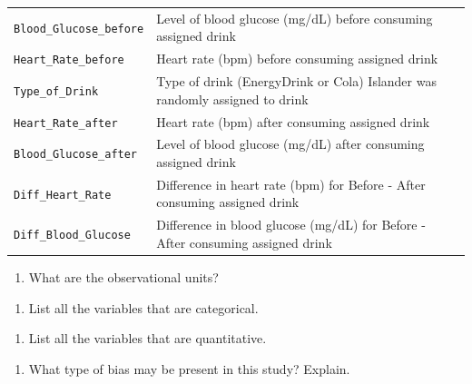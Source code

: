 \documentclass[
]{report}
\providecommand{\tightlist}{%
  \setlength{\itemsep}{0pt}\setlength{\parskip}{0pt}}
\begin{document}
\begin{longtable}[]{@{}
  >{\raggedright\arraybackslash}p{}
  >{\raggedright\arraybackslash}p{}@{}}
\texttt{Blood\_Glucose\_before} & Level of blood glucose (mg/dL) before consuming assigned drink \\
\texttt{Heart\_Rate\_before} & Heart rate (bpm) before consuming assigned drink \\
\texttt{Type\_of\_Drink} & Type of drink (EnergyDrink or Cola) Islander was randomly assigned to drink \\
\texttt{Heart\_Rate\_after} & Heart rate (bpm) after consuming assigned drink \\
\texttt{Blood\_Glucose\_after} & Level of blood glucose (mg/dL) after consuming assigned drink \\
\texttt{Diff\_Heart\_Rate} & Difference in heart rate (bpm) for Before - After consuming assigned drink \\
\texttt{Diff\_Blood\_Glucose} & Difference in blood glucose (mg/dL) for Before - After consuming assigned drink \\
\bottomrule
\end{longtable}

\begin{enumerate}
\def\labelenumi{\arabic{enumi}.}
\tightlist
\item
  What are the observational units?
\end{enumerate}

\vspace{0.3in}

\begin{enumerate}
\def\labelenumi{\arabic{enumi}.}
\setcounter{enumi}{1}
\tightlist
\item
  List all the variables that are categorical.
\end{enumerate}

\vspace{0.8in}

\begin{enumerate}
\def\labelenumi{\arabic{enumi}.}
\setcounter{enumi}{2}
\tightlist
\item
  List all the variables that are quantitative.
\end{enumerate}

\vspace{0.8in}

\begin{enumerate}
\def\labelenumi{\arabic{enumi}.}
\setcounter{enumi}{3}
\tightlist
\item
  What type of bias may be present in this study? Explain.
\end{enumerate}
\end{document}
